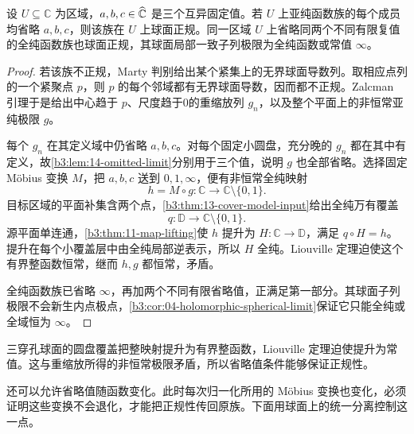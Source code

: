 \begin{theorem}\label{b3:thm:14-montel-omitted}
设 \(U\subseteq\mathbb C\) 为区域，\(a,b,c\in\widehat{\mathbb C\kern0pt}\) 是三个互异固定值。若 \(U\) 上亚纯函数族的每个成员均省略 \(a,b,c\)，则该族在 \(U\) 上球面正规。同一区域 \(U\) 上省略同两个不同有限复值的全纯函数族也球面正规，其球面局部一致子列极限为全纯函数或常值 \(\infty\)。
\end{theorem}
\begin{proof}
若该族不正规，Marty 判别给出某个紧集上的无界球面导数列。取相应点列的一个紧聚点 \(p\)，则 \(p\) 的每个邻域都有无界球面导数，因而都不正规。Zalcman 引理于是给出中心趋于 \(p\)、尺度趋于0的重缩放列 \(g_n\)，以及整个平面上的非恒常亚纯极限 \(g\)。

每个 \(g_n\) 在其定义域中仍省略 \(a,b,c\)。对每个固定小圆盘，充分晚的 \(g_n\) 都在其中有定义，故\cref{b3:lem:14-omitted-limit}分别用于三个值，说明 \(g\) 也全部省略。选择固定 Möbius 变换 \(M\)，把 \(a,b,c\) 送到 \(0,1,\infty\)，便有非恒常全纯映射
\[
 h=M\circ g:\mathbb C\longrightarrow\mathbb C\setminus\{0,1\}.
\]
目标区域的平面补集含两个点，\cref{b3:thm:13-cover-model-input}给出全纯万有覆盖
\[
 q:\mathbb D\longrightarrow\mathbb C\setminus\{0,1\}.
\]
源平面单连通，\cref{b3:thm:11-map-lifting}使 \(h\) 提升为 \(H:\mathbb C\to\mathbb D\)，满足 \(q\circ H=h\)。提升在每个小覆盖层中由全纯局部逆表示，所以 \(H\) 全纯。Liouville 定理迫使这个有界整函数恒常，继而 \(h,g\) 都恒常，矛盾。

全纯函数族已省略 \(\infty\)，再加两个不同有限省略值，正满足第一部分。其球面子列极限不会新生内点极点，\cref{b3:cor:04-holomorphic-spherical-limit}保证它只能全纯或全域恒为 \(\infty\)。
\end{proof}

三穿孔球面的圆盘覆盖把整映射提升为有界整函数，Liouville 定理迫使提升为常值。这与重缩放所得的非恒常极限矛盾，所以省略值条件能够保证正规性。

\ProseParagraphBreak
还可以允许省略值随函数变化。此时每次归一化所用的 Möbius 变换也变化，必须证明这些变换不会退化，才能把正规性传回原族。下面用球面上的统一分离控制这一点。

